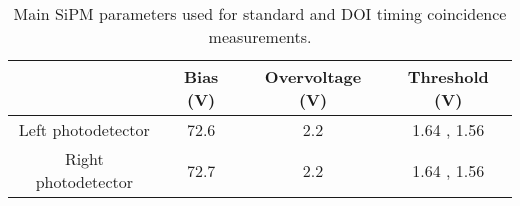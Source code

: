 \begin{table}
\caption{\label{tab:optimumparam} Main SiPM parameters used for standard and DOI timing coincidence measurements.} 
\begin{tabular}{cccc}
\hline
{} & Bias (V) & Overvoltage (V) & Threshold (V) \\
\hline
Left photodetector  &     72.6 &             2.2 &   1.64 , 1.56 \\
Right photodetector &     72.7 &             2.2 &   1.64 , 1.56 \\
\hline
\end{tabular}
\end{table}

